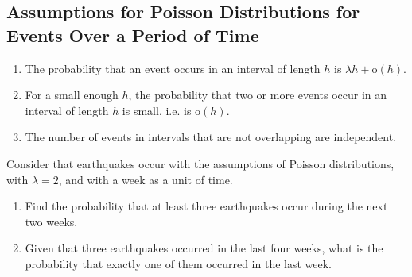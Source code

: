 \documentclass[titlepage, fleqn, a4paper, 12pt, twoside]{article}
\theoremstyle{definition}
\theoremstyle{theorem}
\begin{document}
\subsection{Assumptions for Poisson Distributions for Events Over a Period of Time}

\begin{enumerate}
	\item The probability that an event occurs in an interval of length $h$ is $\lambda h + \mathrm{o}(h)$.
	\item For a small enough $h$, the probability that two or more events occur in an interval of length $h$ is small, i.e. is $\mathrm{o}(h)$.
	\item The number of events in intervals that are not overlapping are independent.
\end{enumerate}

\begin{question}
	Consider that earthquakes occur with the assumptions of Poisson distributions, with $\lambda = 2$, and with a week as a unit of time.
	\begin{enumerate}
		\item Find the probability that at least three earthquakes occur during the next two weeks.
		\item Given that three earthquakes occurred in the last four weeks, what is the probability that exactly one of them occurred in the last week.
	\end{enumerate}
\end{question}
\end{document}
